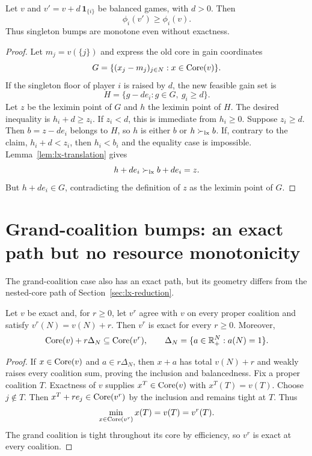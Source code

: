 \begin{theorem}
\label{thm:lx-singleton}
Let $v$ and $v'=v+d\,\mathbf 1_{\{i\}}$ be balanced games, with $d>0$.
Then
\[
 \phi_i(v')\geq\phi_i(v).
\]
Thus singleton bumps are monotone even without exactness.
\end{theorem}

\begin{proof}
Let $m_j=v(\{j\})$ and express the old core in gain coordinates
\[
 G=\{(x_j-m_j)_{j\in N}:x\in\operatorname{Core}(v)\}.
\]
If the singleton floor of player $i$ is raised by $d$, the new feasible gain
set is
\[
 H=\{g-d e_i:g\in G,\ g_i\geq d\}.
\]
Let $z$ be the leximin point of $G$ and $h$ the leximin point of $H$.
The desired inequality is $h_i+d\geq z_i$.  If $z_i<d$, this is immediate
from $h_i\geq0$.  Suppose $z_i\geq d$.  Then $b=z-d e_i$ belongs to $H$, so
$h$ is either $b$ or $h\succ_{\rm lx}b$.  If, contrary to the claim,
$h_i+d<z_i$, then $h_i<b_i$ and the equality case is impossible.
Lemma~\ref{lem:lx-translation} gives
\[
 h+d e_i\succ_{\rm lx}b+d e_i=z.
\]
But $h+d e_i\in G$, contradicting the definition of $z$ as the leximin point
of $G$.
\end{proof}


\section{Grand-coalition bumps: an exact path but no resource monotonicity}
\label{sec:lx-grand}

The grand-coalition case also has an exact path, but its geometry differs from
the nested-core path of Section~\ref{sec:lx-reduction}.

\begin{lemma}\label{lem:lx-grand-path}
Let $v$ be exact and, for $r\geq0$, let $v^r$ agree with $v$ on every proper
coalition and satisfy $v^r(N)=v(N)+r$.  Then $v^r$ is exact for every $r\geq0$.
Moreover,
\[
 \operatorname{Core}(v)+r\Delta_N\subseteq\operatorname{Core}(v^r),
 \qquad
 \Delta_N=\{a\in\mathbb{R}^N_+:a(N)=1\}.
\]
\end{lemma}

\begin{proof}
If $x\in\operatorname{Core}(v)$ and $a\in r\Delta_N$, then $x+a$ has total
$v(N)+r$ and weakly raises every coalition sum, proving the inclusion and
balancedness.  Fix a proper coalition $T$.  Exactness of $v$ supplies
$x^T\in\operatorname{Core}(v)$ with $x^T(T)=v(T)$.  Choose $j\notin T$.  Then
$x^T+r e_j\in\operatorname{Core}(v^r)$ by the inclusion and remains tight at $T$.
Thus
\[
 \min_{x\in\operatorname{Core}(v^r)}x(T)=v(T)=v^r(T).
\]
The grand coalition is tight throughout its core by efficiency, so $v^r$ is
exact at every coalition.
\end{proof}

